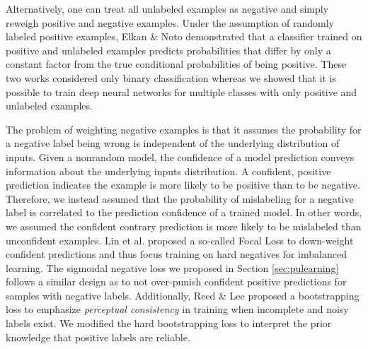 Alternatively, one can treat all unlabeled examples as negative and simply reweigh positive and negative examples\cite{lee2003learning}.
Under the assumption of randomly labeled positive examples, Elkan \& Noto\cite{elkan2008learning} demonstrated that a classifier trained on positive and unlabeled examples predicts probabilities that differ by only a constant factor from the true conditional probabilities of being positive.
These two works considered only binary classification whereas we showed that it is possible to train deep neural networks for multiple classes with only positive and unlabeled examples.

The problem of weighting negative examples is that it assumes the probability for a negative label being wrong is independent of the underlying distribution of inputs.
Given a nonrandom model, the confidence of a model prediction conveys information about the underlying inputs distribution.
A confident, positive prediction indicates the example is more likely to be positive than to be negative.
Therefore, we instead assumed that the probability of mislabeling for a negative label is correlated to the prediction confidence of a trained model.
In other words, we assumed the confident contrary prediction is more likely to be mislabeled than unconfident examples.
Lin et al.\cite{lin2017focal} proposed a so-called Focal Loss to down-weight confident predictions and thus focus training on hard negatives for imbalanced learning.
The sigmoidal negative loss we proposed in Section \ref{sec:pulearning} follows a similar design as \cite{lin2017focal} to not over-punish confident positive predictions for samples with negative labels.
Additionally, Reed \& Lee\cite{reed2014training} proposed a bootstrapping loss to emphasize \textit{perceptual consistency} in training when incomplete and noisy labels exist.
We modified the hard bootstrapping loss to interpret the prior knowledge that positive labels are reliable.
